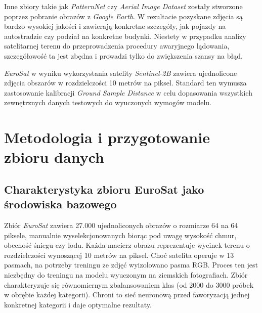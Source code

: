 \documentclass[12pt, a4paper]{report}
\begin{document}
\par Inne zbiory takie jak \emph{PatternNet} czy \emph{Aerial Image Dataset} zostały stworzone poprzez pobranie obrazów z \emph{Google Earth}. W rezultacie pozyskane zdjęcia są bardzo wysokiej jakości i zawierają konkretne szczegóły, jak pojazdy na autostradzie czy podział na konkretne budynki. Niestety w przypadku analizy satelitarnej terenu do przeprowadzenia procedury awaryjnego lądowania, szczegółowość ta jest zbędna i prowadzi tylko do zwiększenia szansy na błąd. 
\par \emph{EuroSat} w wyniku wykorzystania satelity \emph{Sentinel-2B} zawiera ujednolicone zdjęcia obszarów w rozdzielczości 10 metrów na piksel. Standard ten wymusza zastosowanie kalibracji \emph{Ground Sample Distance} w celu dopasowania wszystkich zewnętrznych danych testowych do wyuczonych wymogów modelu.


\chapter{Metodologia i przygotowanie zbioru danych}
\section{Charakterystyka zbioru EuroSat jako środowiska bazowego}
\par Zbiór \emph{EuroSat} zawiera 27.000 ujednoliconych obrazów o rozmiarze 64 na 64 piksele, manualnie wyselekcjonowanych biorąc pod uwagę wysokość chmur, obecność śniegu czy lodu. \cite{helber_euroSat}  Każda macierz obrazu reprezentuje wycinek terenu o rozdzielczości wynoszącej 10 metrów na piksel. Choć satelita operuje w 13 pasmach, na potrzeby treningu ze zdjęć wyizolowano pasma RGB. Proces ten jest niezbędny do treningu na modelu wyuczonym na ziemskich fotografiach. Zbiór charakteryzuje się równomiernym zbalansowaniem klas (od 2000 do 3000 próbek w obrębie każdej kategorii). Chroni to sieć neuronową przed faworyzacją jednej konkretnej kategorii i daje optymalne rezultaty.
\end{document}
